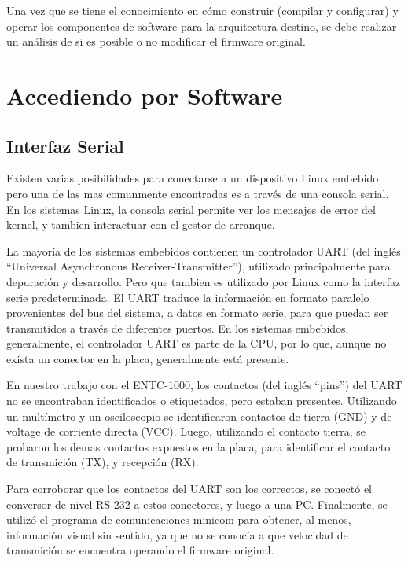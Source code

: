 \documentclass[conference]{IEEEtran}
\begin{document}
Una vez que se tiene el conocimiento en cómo construir (compilar y configurar)
y operar los componentes de software para la arquitectura destino, se
debe realizar un análisis de si es posible o no modificar el firmware original.











\section{Accediendo por Software}

\subsection{Interfaz Serial}

Existen varias posibilidades para conectarse a un dispositivo 
Linux embebido, pero una de las mas comunmente encontradas es
a través de una consola serial. En los sistemas Linux, la 
consola serial permite ver los mensajes de error del kernel,
y tambien interactuar con el gestor de arranque.

La mayoría de los sistemas embebidos contienen un controlador 
UART (del inglés ``Universal Asynchronous Receiver-Transmitter''),
utilizado principalmente para depuración y desarrollo.
Pero que tambien es utilizado por Linux como la interfaz serie
predeterminada.
El UART traduce la información en formato paralelo
provenientes del bus del sistema, a datos en formato serie,
para que puedan ser transmitidos a través de diferentes puertos.
En los sistemas embebidos, generalmente, el controlador UART es parte de la CPU,
por lo que, aunque no exista un conector en la placa, generalmente
está presente.

En nuestro trabajo con el ENTC-1000, los contactos (del inglés ``pins'') del UART
no se encontraban identificados o etiquetados, pero estaban presentes.
Utilizando un multímetro y un osciloscopio se identificaron contactos
de tierra (GND) y de voltage de corriente directa (VCC). Luego, utilizando
el contacto tierra, se probaron los demas contactos expuestos en la placa,
para identificar el contacto de transmición (TX), y recepción (RX).

Para corroborar que los contactos del UART son los correctos, se conectó
el conversor de nivel RS-232 a estos conectores, y luego a una PC.
Finalmente, se utilizó el programa de comunicaciones minicom para
obtener, al menos, información visual sin sentido, ya que
no se conocía a que velocidad de transmición se encuentra operando
el firmware original.
\end{document}
